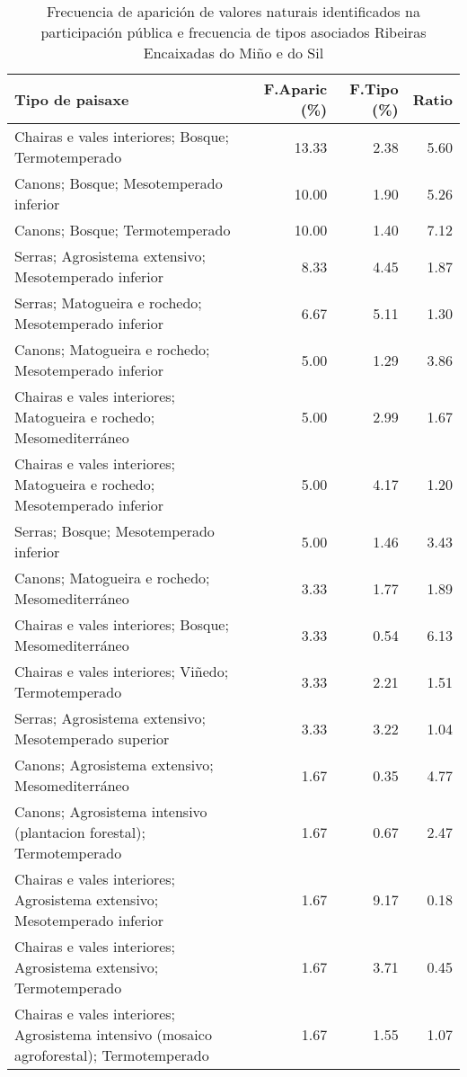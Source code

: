 \begin{table}[p]
\centering
\caption{Frecuencia de aparición de valores naturais identificados na participación pública e frecuencia de tipos asociados Ribeiras Encaixadas do Miño e do Sil} 
\label{vsixotnat4}
\begin{tabular}{lrrr}
  \hline
Tipo de paisaxe & F.Aparic (\%) & F.Tipo (\%) & Ratio \\ 
  \hline
Chairas e vales interiores; Bosque; Termotemperado & 13.33 & 2.38 & 5.60 \\ 
  Canons; Bosque; Mesotemperado inferior & 10.00 & 1.90 & 5.26 \\ 
  Canons; Bosque; Termotemperado & 10.00 & 1.40 & 7.12 \\ 
  Serras; Agrosistema extensivo; Mesotemperado inferior & 8.33 & 4.45 & 1.87 \\ 
  Serras; Matogueira e rochedo; Mesotemperado inferior & 6.67 & 5.11 & 1.30 \\ 
  Canons; Matogueira e rochedo; Mesotemperado inferior & 5.00 & 1.29 & 3.86 \\ 
  Chairas e vales interiores; Matogueira e rochedo; Mesomediterráneo & 5.00 & 2.99 & 1.67 \\ 
  Chairas e vales interiores; Matogueira e rochedo; Mesotemperado inferior & 5.00 & 4.17 & 1.20 \\ 
  Serras; Bosque; Mesotemperado inferior & 5.00 & 1.46 & 3.43 \\ 
  Canons; Matogueira e rochedo; Mesomediterráneo & 3.33 & 1.77 & 1.89 \\ 
  Chairas e vales interiores; Bosque; Mesomediterráneo & 3.33 & 0.54 & 6.13 \\ 
  Chairas e vales interiores; Viñedo; Termotemperado & 3.33 & 2.21 & 1.51 \\ 
  Serras; Agrosistema extensivo; Mesotemperado superior & 3.33 & 3.22 & 1.04 \\ 
  Canons; Agrosistema extensivo; Mesomediterráneo & 1.67 & 0.35 & 4.77 \\ 
  Canons; Agrosistema intensivo (plantacion forestal); Termotemperado & 1.67 & 0.67 & 2.47 \\ 
  Chairas e vales interiores; Agrosistema extensivo; Mesotemperado inferior & 1.67 & 9.17 & 0.18 \\ 
  Chairas e vales interiores; Agrosistema extensivo; Termotemperado & 1.67 & 3.71 & 0.45 \\ 
  Chairas e vales interiores; Agrosistema intensivo (mosaico agroforestal); Termotemperado & 1.67 & 1.55 & 1.07 \\ 

\end{tabular}
\end{table}
